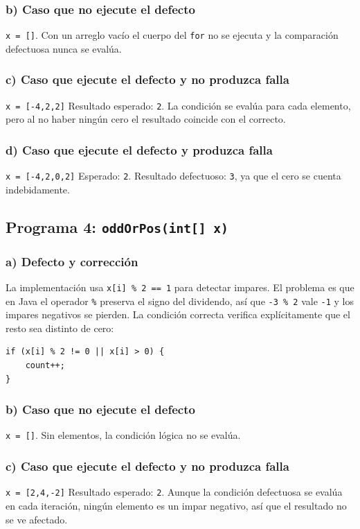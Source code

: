 \documentclass[12pt,a4paper]{article}
\begin{document}
\subsubsection*{b) Caso que no ejecute el defecto}
\texttt{x = []}. Con un arreglo vacío el cuerpo del \texttt{for} no se ejecuta y la comparación defectuosa nunca se evalúa.

\subsubsection*{c) Caso que ejecute el defecto y no produzca falla}
\texttt{x = [-4,2,2]} \hspace{0.5cm} Resultado esperado: \texttt{2}. La condición se evalúa para cada elemento, pero al no haber ningún cero el resultado coincide con el correcto.

\subsubsection*{d) Caso que ejecute el defecto y produzca falla}
\texttt{x = [-4,2,0,2]} \hspace{0.5cm} Esperado: \texttt{2}. Resultado defectuoso: \texttt{3}, ya que el cero se cuenta indebidamente.

\subsection{Programa 4: \texttt{oddOrPos(int[] x)}}
\subsubsection*{a) Defecto y corrección}
La implementación usa \texttt{x[i] \% 2 == 1} para detectar impares. El problema es que en Java el operador \texttt{\%} preserva el signo del dividendo, así que \texttt{-3 \% 2} vale \texttt{-1} y los impares negativos se pierden. La condición correcta verifica explícitamente que el resto sea distinto de cero:
\begin{lstlisting}[style=javastyle]
if (x[i] % 2 != 0 || x[i] > 0) {
    count++;
}
\end{lstlisting}

\subsubsection*{b) Caso que no ejecute el defecto}
\texttt{x = []}. Sin elementos, la condición lógica no se evalúa.

\subsubsection*{c) Caso que ejecute el defecto y no produzca falla}
\texttt{x = [2,4,-2]} \hspace{0.5cm} Resultado esperado: \texttt{2}. Aunque la condición defectuosa se evalúa en cada iteración, ningún elemento es un impar negativo, así que el resultado no se ve afectado.
\end{document}
